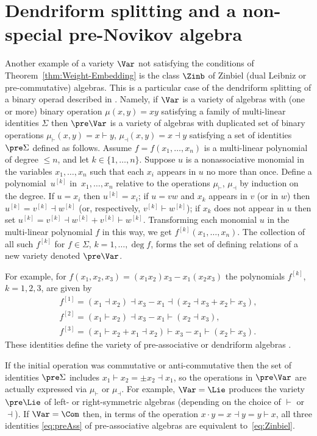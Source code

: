 \section{Dendriform splitting and a non-special pre-Novikov algebra}

Another example of a variety
$\Var $ not satisfying the conditions
of Theorem~\ref{thm:Weight-Embedding}
is the class $\Zinb$ of Zinbiel (dual Leibniz or pre-commutative) algebras.
This is a particular case of the dendriform
splitting of a binary operad described in
\cite{BBGN, GubKol2014}.
Namely,
if $\Var $ is a variety of algebras with (one or more) binary operation
$\mu (x,y) = xy$ satisfying a family
of multi-linear identities $\Sigma $
then
$\pre\Var $ is a variety of algebras with
duplicated set of binary operations
$\mu_\vdash (x,y)=x\vdash y $,
$\mu_\dashv (x,y) = x\dashv y$
satisfying a set of identities $\pre\Sigma $
defined as follows.
Assume $f = f(x_1,\dots, x_n)$ is a multi-linear polynomial of degree $\le n$, and let $k\in \{1,\dots, n\}$.
Suppose $u$ is a nonassociative monomial in the variables
$x_1,\dots, x_n$ such that each $x_i$ appears in $u$
no more than once.
Define a polynomial~$u^{[k]}$ in~$x_1,\dots, x_n$
relative to the operations $\mu_\vdash $, $\mu _\dashv$
by induction on the degree.
If $u=x_i$ then
$u^{[k]} = x_i$;
if $u = vw$ and $x_k$ appears in $v$ (or in $w$) then
$u^{[k]} = v^{[k]}\dashv w^{[k]}$ (or, respectively,
$v^{[k]}\vdash w^{[k]}$);
if $x_k$ does not appear in $u$ then set
$u^{[k]}=
v^{[k]}\dashv w^{[k]} + v^{[k]}\vdash w^{[k]}$.
Transforming each monomial $u$ in the
multi-linear polynomial $f$
in this way, we get $f^{[k]}(x_1,\dots, x_n)$.
The collection of all such $f^{[k]}$
for $f\in \Sigma $, $k=1,\dots,\deg f$,
forms the set of defining relations of a new variety denoted
$\pre\Var $.

For example, for $f(x_1,x_2,x_3)
= (x_1x_2)x_3 - x_1(x_2x_3)$
the polynomials $f^{[k]}$, $k=1,2,3$, are given by
%
\begin{gather}
f^{[1]} = (x_1\dashv x_2)\dashv x_3 - x_1\dashv (x_2\dashv x_3 + x_2\vdash x_3),\nonumber \\
f^{[2]}
= (x_1\vdash x_2)\dashv x_3 - x_1\vdash (x_2\dashv x_3),\nonumber\\
f^{[3]}
= (x_1\vdash x_2 + x_1\dashv x_2)\vdash x_3 - x_1\vdash (x_2\vdash x_3).\label{eq:preAss}
\end{gather}
These identities define the variety of pre-associative
or dendriform algebras \cite{Loday}.

If the initial operation was commutative or anti-commutative then the set of identities $\pre\Sigma $
includes $x_1\vdash x_2 = \pm x_2\dashv x_1$,
so the operations in $\pre\Var $ are actually
expressed via $\mu_\vdash $ or $\mu_\dashv $.
For example, $\Var=\Lie$ produces the variety
$\pre\Lie$ of left- or right-symmetric algebras
(depending on the choice of $\vdash $ or $\dashv$).
If $\Var = \Com$ then, in terms of the operation
$x\cdot y = x\dashv y = y\vdash x$,
all three identities \eqref{eq:preAss}
of pre-associative algebras are equivalent to~\eqref{eq:Zinbiel}.

